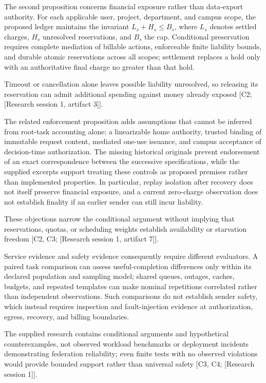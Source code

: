 \documentclass[11pt]{article}
\begin{document}
The second proposition concerns financial exposure rather than data-export authority. For each applicable user, project, department, and campus scope, the proposed ledger maintains the invariant $L_s+H_s\leq B_s$, where $L_s$ denotes settled charges, $H_s$ unresolved reservations, and $B_s$ the cap. Conditional preservation requires complete mediation of billable actions, enforceable finite liability bounds, and durable atomic reservations across all scopes; settlement replaces a hold only with an authoritative final charge no greater than that hold.

Timeout or cancellation alone leaves possible liability unresolved, so releasing its reservation can admit additional spending against money already exposed [C2; [Research session 1, artifact 3]].

The related enforcement proposition adds assumptions that cannot be inferred from root-task accounting alone: a linearizable home authority, trusted binding of immutable request content, mediated one-use issuance, and campus acceptance of decision-time authorization. The missing historical originals prevent endorsement of an exact correspondence between the successive specifications, while the supplied excerpts support treating these controls as proposed premises rather than implemented properties. In particular, replay isolation after recovery does not itself preserve financial exposure, and a current zero-charge observation does not establish finality if an earlier sender can still incur liability.

These objections narrow the conditional argument without implying that reservations, quotas, or scheduling weights establish availability or starvation freedom [C2, C3; [Research session 1, artifact 7]].

Service evidence and safety evidence consequently require different evaluators. A paired task comparison can assess useful-completion differences only within its declared population and sampling model; shared queues, outages, caches, budgets, and repeated templates can make nominal repetitions correlated rather than independent observations. Such comparisons do not establish sender safety, which instead requires inspection and fault-injection evidence at authorization, egress, recovery, and billing boundaries.

The supplied research contains conditional arguments and hypothetical counterexamples, not observed workload benchmarks or deployment incidents demonstrating federation reliability; even finite tests with no observed violations would provide bounded support rather than universal safety [C3, C4; [Research session 1]].
\end{document}
